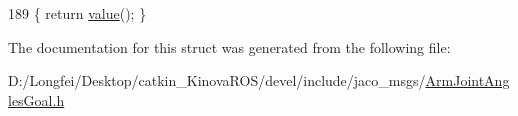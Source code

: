 \begin{DoxyCode}
189 \{ \textcolor{keywordflow}{return} \hyperlink{structros_1_1message__traits_1_1Definition_3_01_1_1jaco__msgs_1_1ArmJointAnglesGoal___3_01ContainerAllocator_01_4_01_4_ad5720b4ad40070f8f6b848a5d0a5f1f2}{value}(); \}
\end{DoxyCode}


The documentation for this struct was generated from the following file\+:\begin{DoxyCompactItemize}
\item 
D\+:/\+Longfei/\+Desktop/catkin\+\_\+\+Kinova\+R\+O\+S/devel/include/jaco\+\_\+msgs/\hyperlink{ArmJointAnglesGoal_8h}{Arm\+Joint\+Angles\+Goal.\+h}\end{DoxyCompactItemize}
